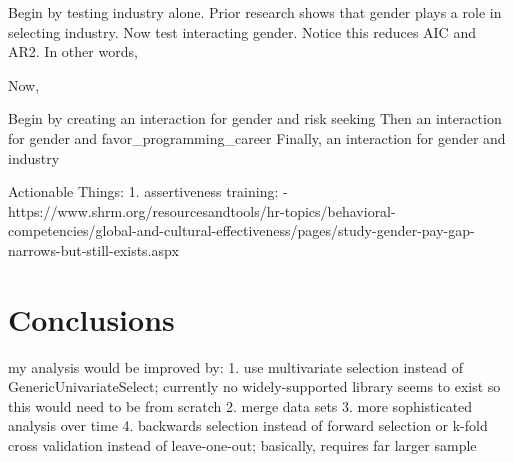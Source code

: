 \documentclass[review]{elsarticle}
\begin{document}

Begin by testing industry alone. Prior research shows that gender plays a role in selecting industry.
Now test interacting gender. Notice this reduces AIC and AR2. In other words,

Now,

Begin by creating an interaction for gender and risk seeking
Then an interaction for gender and favor_programming_career
Finally, an interaction for gender and industry


Actionable Things:
1.  assertiveness training:
 - https://www.shrm.org/resourcesandtools/hr-topics/behavioral-competencies/global-and-cultural-effectiveness/pages/study-gender-pay-gap-narrows-but-still-exists.aspx


\section{Conclusions}



my analysis would be improved by:
  1. use multivariate selection instead of GenericUnivariateSelect; currently no widely-supported library seems to exist so this would need to be from scratch
  2. merge data sets
  3. more sophisticated analysis over time
  4. backwards selection instead of forward selection or k-fold cross validation instead of leave-one-out; basically, requires far larger sample
\end{document}

